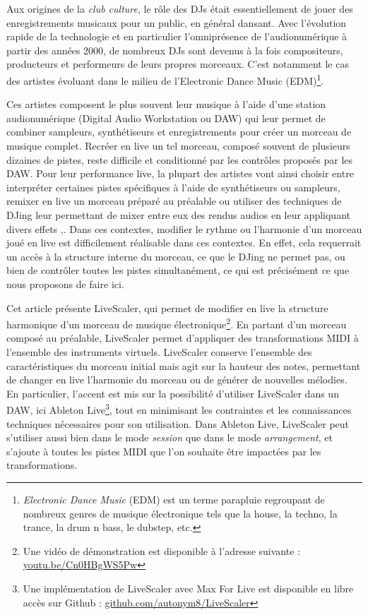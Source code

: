 Aux origines de la \emph{club culture}, le rôle des DJs était essentiellement de jouer des enregistrements musicaux pour un public, en général dansant. Avec l’évolution rapide de la technologie et en particulier l’omniprésence de l’audionumérique à partir des années 2000, de nombreux DJs sont devenus à la fois compositeurs, producteurs et performeurs de leurs propres morceaux. C'est notamment le cas des artistes évoluant dans le milieu de l'Electronic Dance Music (EDM)\footnote{\emph{Electronic Dance Music} (EDM) est un terme parapluie regroupant de nombreux genres de musique électronique tels que la house, la techno, la trance, la drum n bass, le dubstep, etc. }.


Ces artistes composent le plus souvent leur musique à l’aide d’une station audionumérique (Digital Audio Workstation ou DAW) qui leur permet de combiner sampleurs, synthétiseurs et enregistrements pour créer un morceau de musique complet. Recréer en live un tel morceau, composé souvent de plusieurs dizaines de pistes, reste difficile et conditionné par les contrôles proposés par les DAW. Pour leur performance live, la plupart des artistes vont ainsi choisir entre interpréter certaines pistes spécifiques à l'aide de synthétiseurs ou sampleurs, remixer en live un morceau préparé au préalable ou utiliser des techniques de DJing leur permettant de mixer entre eux des rendus audios en leur appliquant divers effets \cite{ferreira2008sound},\cite{magana2018performance}.  Dans ces contextes,  modifier le rythme ou l'harmonie d’un morceau joué en live est difficilement réalisable dans ces contextes. En effet, cela requerrait un accès à la structure interne du morceau, ce que le DJing ne permet pas, ou bien de contrôler toutes les pistes simultanément, ce qui est précisément ce que nous proposons de faire ici.

Cet article présente LiveScaler, qui per\-met de modifier en live la structure harmonique d'un morceau de musique électronique\footnote{Une vidéo de démonstration est disponible à l'adresse suivante : \href{ https://youtu.be/Cn0HBgWS5Pw}{youtu.be/Cn0HBgWS5Pw}}. En partant d'un morceau composé au préalable, LiveScaler permet d'appliquer des transformations MIDI à l'ensemble des instruments virtuels. LiveScaler conserve l'ensemble des caractéristiques du morceau initial mais agit sur la hauteur des notes, permettant de changer en live l'harmonie du morceau ou de générer de nouvelles mélodies. En particulier, l'accent est mis sur la possibilité d'utiliser LiveScaler dans un DAW, ici Ableton Live\footnote{Une implémentation de LiveScaler avec Max For Live est disponible en libre accès sur Github : \href{https://github.com/autonym8/LiveScaler}{github.com/autonym8/LiveScaler}}, tout en minimisant les contraintes et les connaissances techniques nécessaires pour son utilisation. Dans Ableton Live, LiveScaler peut s'utiliser aussi bien dans le mode \emph{session} que dans le mode \emph{arrangement}, et s'ajoute à toutes les pistes MIDI que l'on souhaite être impactées par les transformations.

